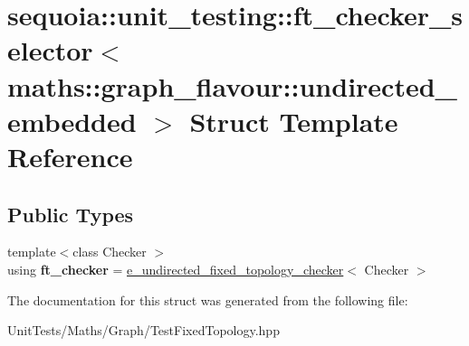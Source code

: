 \hypertarget{structsequoia_1_1unit__testing_1_1ft__checker__selector_3_01maths_1_1graph__flavour_1_1undirected__embedded_01_4}{}\section{sequoia\+::unit\+\_\+testing\+::ft\+\_\+checker\+\_\+selector$<$ maths\+::graph\+\_\+flavour\+::undirected\+\_\+embedded $>$ Struct Template Reference}
\label{structsequoia_1_1unit__testing_1_1ft__checker__selector_3_01maths_1_1graph__flavour_1_1undirected__embedded_01_4}
\subsection*{Public Types}
\begin{DoxyCompactItemize}
\item 
\mbox{\label{structsequoia_1_1unit__testing_1_1ft__checker__selector_3_01maths_1_1graph__flavour_1_1undirected__embedded_01_4_a0a2f7f1158c42ccfc6d4d3a4a2e50212}} 
{\footnotesize template$<$class Checker $>$ }\\using {\bfseries ft\+\_\+checker} = \mbox{\hyperlink{classsequoia_1_1unit__testing_1_1e__undirected__fixed__topology__checker}{e\+\_\+undirected\+\_\+fixed\+\_\+topology\+\_\+checker}}$<$ Checker $>$
\end{DoxyCompactItemize}


The documentation for this struct was generated from the following file\+:\begin{DoxyCompactItemize}
\item 
Unit\+Tests/\+Maths/\+Graph/Test\+Fixed\+Topology.\+hpp\end{DoxyCompactItemize}
